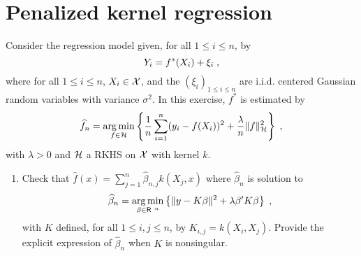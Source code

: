 \section{Penalized kernel regression}
\label{ex:penalized:kernel:regression}
Consider the regression model given, for all $1\leqslant i\leqslant n$, by
\[
Y_{i}=f^*(X_{i})+\xi_{i}\;,
\]
where for all $1\leqslant i\leqslant n$, $X_i\in\mathcal{X}$, and the $(\xi_{i})_{1\leqslant i \leqslant n}$ are i.i.d. centered Gaussian random variables with variance $\sigma^2$. In this exercise, $f^*$ is estimated by
\[
\widehat f_n=\argmin_{f\in\calH}\left\{{1\over n}\sum_{i=1}^n(y_{i}-f(X_{i}))^2+{\lambda\over n} \|f\|_{\calH}^2\right\}\eqsp,
\]
with $\lambda>0$  and $\mathcal{H}$  a RKHS on $\mathcal{X}$ with kernel $k$.
\begin{enumerate}
\item Check that $\widehat f(x)=\sum_{j=1}^n\widehat \beta_{n,j}k(X_{j},x)$ where $\widehat \beta_n$ is solution to
$$
\widehat \beta_n =\argmin_{\beta\in\R^n}\left\{\|y-K\beta\|^2+{\lambda} \beta'K\beta\right\}\eqsp,
$$
with $K$ defined, for all $1\leqslant i,j\leqslant n$, by $K_{i,j}=k (X_{i},X_{j})$.  Provide the explicit expression of $\widehat \beta_n$ when $K$ is nonsingular.

\vspace{.2cm}


\end{enumerate}
